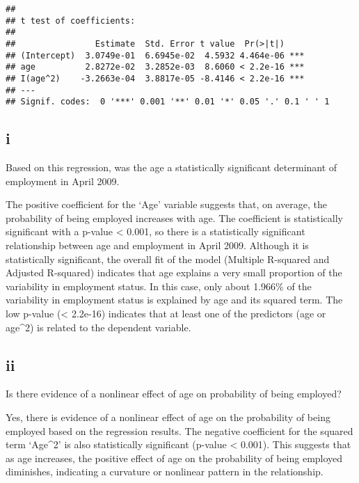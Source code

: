 \documentclass[
]{article}
\begin{document}
\begin{verbatim}
## 
## t test of coefficients:
## 
##                Estimate  Std. Error t value  Pr(>|t|)    
## (Intercept)  3.0749e-01  6.6945e-02  4.5932 4.464e-06 ***
## age          2.8272e-02  3.2852e-03  8.6060 < 2.2e-16 ***
## I(age^2)    -3.2663e-04  3.8817e-05 -8.4146 < 2.2e-16 ***
## ---
## Signif. codes:  0 '***' 0.001 '**' 0.01 '*' 0.05 '.' 0.1 ' ' 1
\end{verbatim}

\hypertarget{i}{%
\subsection{i}\label{i}}

Based on this regression, was the age a statistically significant
determinant of employment in April 2009. \vspace{1em}

The positive coefficient for the `Age' variable suggests that, on
average, the probability of being employed increases with age. The
coefficient is statistically significant with a p-value \textless{}
0.001, so there is a statistically significant relationship between age
and employment in April 2009. Although it is statistically significant,
the overall fit of the model (Multiple R-squared and Adjusted R-squared)
indicates that age explains a very small proportion of the variability
in employment status. In this case, only about 1.966\% of the
variability in employment status is explained by age and its squared
term. The low p-value (\textless{} 2.2e-16) indicates that at least one
of the predictors (age or age\^{}2) is related to the dependent
variable.

\hypertarget{ii}{%
\subsection{ii}\label{ii}}

Is there evidence of a nonlinear effect of age on probability of being
employed? \vspace{1em}

Yes, there is evidence of a nonlinear effect of age on the probability
of being employed based on the regression results. The negative
coefficient for the squared term `Age\^{}2' is also statistically
significant (p-value \textless{} 0.001). This suggests that as age
increases, the positive effect of age on the probability of being
employed diminishes, indicating a curvature or nonlinear pattern in the
relationship.
\end{document}
